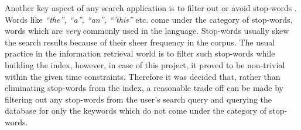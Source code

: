 \documentclass[letterpaper,twocolumn,10pt]{article}
\begin{document}
Another key aspect of any search application is to filter out or avoid stop-words
. Words like \textit{``the'', ``a'', ``an'', ``'this''} etc. come under the
category of stop-words, words which are \emph{very} commonly used in the
language. Stop-words usually skew the search results because of their sheer
frequency in the corpus. The usual practice in the information retrieval world
is to filter such stop-words while building the index, however, in case of this
project, it proved to be non-trivial within the given time constraints.
Therefore it was decided that, rather than eliminating stop-words from the index,
a reasonable trade off can be made by filtering out any stop-words from the
user's search query and querying the database for only the keywords which do
not come under the category of stop-words. \\
\end{document}

